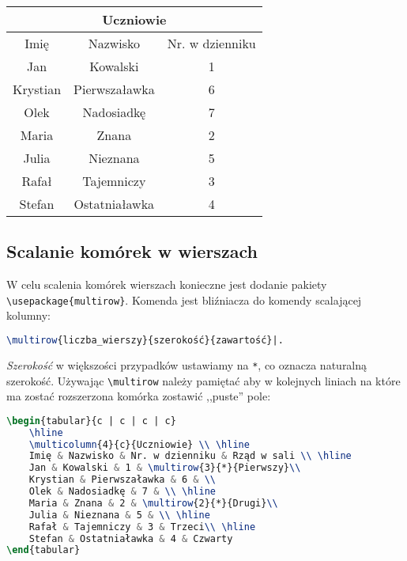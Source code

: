 \documentclass[10pt,a4paper]{article}
\begin{document}
\begin{tabular}{c | c | c}
	\hline
	\multicolumn{3}{c}{Uczniowie} \\ \hline
	Imię & Nazwisko & Nr. w dzienniku \\ \hline
	Jan & Kowalski & 1 \\
	Krystian & Pierwszaławka & 6 \\
	Olek & Nadosiadkę & 7 \\
	Maria & Znana & 2 \\
	Julia & Nieznana & 5 \\
	Rafał & Tajemniczy & 3 \\
	Stefan & Ostatniaławka & 4
\end{tabular}

\subsection{Scalanie komórek w wierszach}

W celu scalenia komórek wierszach konieczne jest dodanie pakiety \lstinline|\usepackage{multirow}|. Komenda jest bliźniacza do komendy scalającej kolumny:

\begin{lstlisting}[language=TeX]
\multirow{liczba_wierszy}{szerokość}{zawartość}|. 
\end{lstlisting}

\emph{Szerokość} w większości przypadków ustawiamy na \lstinline|*|, co oznacza naturalną szerokość. Używając \lstinline|\multirow| należy pamiętać aby w kolejnych liniach na które ma zostać rozszerzona komórka zostawić ,,puste'' pole:

\begin{lstlisting}[language=TeX]
\begin{tabular}{c | c | c | c}
	\hline
	\multicolumn{4}{c}{Uczniowie} \\ \hline
	Imię & Nazwisko & Nr. w dzienniku & Rząd w sali \\ \hline
	Jan & Kowalski & 1 & \multirow{3}{*}{Pierwszy}\\
	Krystian & Pierwszaławka & 6 & \\
	Olek & Nadosiadkę & 7 & \\ \hline
	Maria & Znana & 2 & \multirow{2}{*}{Drugi}\\
	Julia & Nieznana & 5 & \\ \hline
	Rafał & Tajemniczy & 3 & Trzeci\\ \hline
	Stefan & Ostatniaławka & 4 & Czwarty
\end{tabular}
\end{lstlisting}
\end{document}
